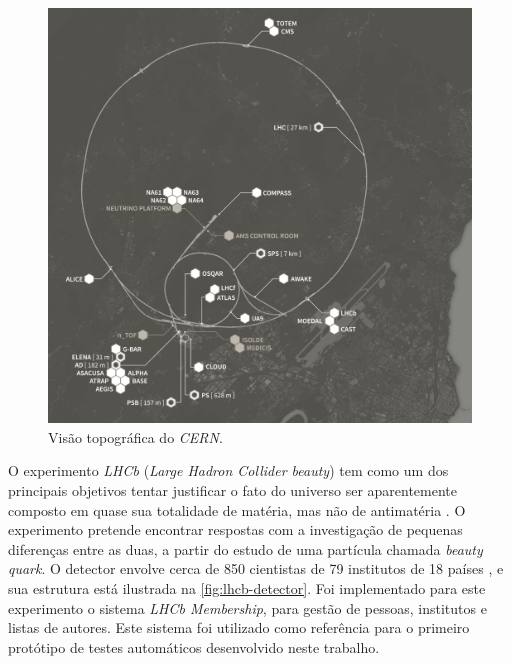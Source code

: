 \begin{figure}[H]
    \centering
    \includegraphics[width=15cm]{source/2-contextualizacao/images/cern-overview-simples.png}
    \caption{Visão topográfica do \emph{CERN}.}
    \label{fig:cern-overview}
\end{figure}

O experimento \emph{LHCb} (\emph{Large Hadron Collider beauty}) tem como um dos principais objetivos tentar justificar o fato do universo ser aparentemente composto em quase sua totalidade de matéria, mas não de antimatéria \cite{cernsiteabout}. O experimento pretende encontrar respostas com a investigação de pequenas diferenças entre as duas, a partir do estudo de uma partícula chamada \emph{beauty quark}. O detector envolve cerca de 850 cientistas de 79 institutos de 18 países \cite{cernsitelhcb}, e sua estrutura está ilustrada na \ref{fig:lhcb-detector}. Foi implementado para este experimento o sistema \emph{LHCb Membership}, para gestão de pessoas, institutos e listas de autores. Este sistema foi utilizado como referência para o primeiro protótipo de testes automáticos desenvolvido neste trabalho.


